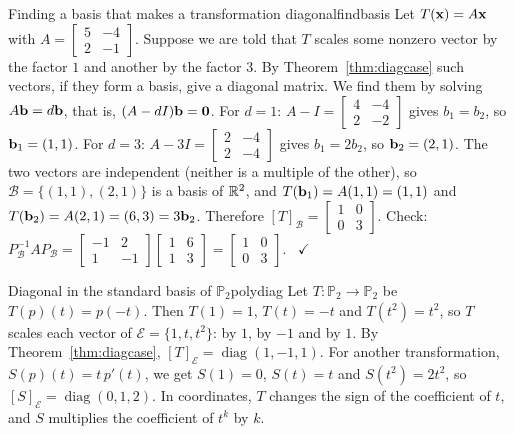 \documentclass[11pt]{article}
\begin{document}
\begin{exmp}{Finding a basis that makes a transformation diagonal}{findbasis}
Let $T(\mathbf{x})=A\mathbf{x}$ with $A=\begin{bmatrix}5&-4\\2&-1\end{bmatrix}$. Suppose we are told that $T$ scales some nonzero vector by the factor $1$ and another by the factor $3$. By Theorem~\ref{thm:diagcase} such vectors, if they form a basis, give a diagonal matrix. We find them by solving $A\mathbf{b}=d\mathbf{b}$, that is, $(A-dI)\mathbf{b}=\mathbf{0}$. For $d=1$: $A-I=\begin{bmatrix}4&-4\\2&-2\end{bmatrix}$ gives $b_1=b_2$, so $\mathbf{b}_1=(1,1)$. For $d=3$: $A-3I=\begin{bmatrix}2&-4\\2&-4\end{bmatrix}$ gives $b_1=2b_2$, so $\mathbf{b}_2=(2,1)$. The two vectors are independent (neither is a multiple of the other), so $\mathcal{B}=\{(1,1),(2,1)\}$ is a basis of $\mathbb{R}^2$, and $T(\mathbf{b}_1)=A(1,1)=(1,1)$ and $T(\mathbf{b}_2)=A(2,1)=(6,3)=3\mathbf{b}_2$. Therefore $[T]_{\mathcal{B}}=\begin{bmatrix}1&0\\0&3\end{bmatrix}$. Check: $P_{\mathcal{B}}^{-1}AP_{\mathcal{B}}=\begin{bmatrix}-1&2\\1&-1\end{bmatrix}\begin{bmatrix}1&6\\1&3\end{bmatrix}=\begin{bmatrix}1&0\\0&3\end{bmatrix}$. \ $\checkmark$
\end{exmp}

\begin{exmp}{Diagonal in the standard basis of $\mathbb{P}_2$}{polydiag}
Let $T:\mathbb{P}_2\to\mathbb{P}_2$ be $T(p)(t)=p(-t)$. Then $T(1)=1$, $T(t)=-t$ and $T(t^2)=t^2$, so $T$ scales each vector of $\mathcal{E}=\{1,t,t^2\}$: by $1$, by $-1$ and by $1$. By Theorem~\ref{thm:diagcase}, $[T]_{\mathcal{E}}=\operatorname{diag}(1,-1,1)$. For another transformation, $S(p)(t)=t\,p'(t)$, we get $S(1)=0$, $S(t)=t$ and $S(t^2)=2t^2$, so $[S]_{\mathcal{E}}=\operatorname{diag}(0,1,2)$. In coordinates, $T$ changes the sign of the coefficient of $t$, and $S$ multiplies the coefficient of $t^k$ by $k$.
\end{exmp}
\end{document}
